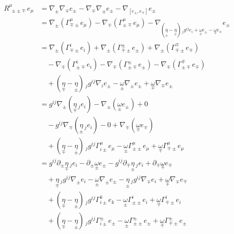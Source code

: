 \documentclass[a4paper,11pt]{article}
\numberwithin{equation}{section}
\theoremstyle{definition}
\begin{document}
\begin{align*}
    R^\mu_{\;\pm\pm\mp} e_\mu &= \nabla_\pm\nabla_\mp e_\pm-\nabla_\mp\nabla_\pm e_\pm-\nabla_{[e_\pm,e_\mp]}e_\pm\\
    &=\nabla_\pm \left(\Gamma_{\mp\pm}^\mu e_\mu \right) - \nabla_\mp \left(\Gamma_{\pm\mp}^\mu e_\mu \right)  - \nabla_{(\underset{\pm}{\eta}-\underset{\mp}{\eta})\,_jg^{ij} e_i+ \underset{\pm}{\omega} e_\pm - \underset{\mp}{\omega} e_\mp}e_\pm\\
    &=\nabla_\pm \left(\Gamma_{\mp\pm}^i e_i \right)
    + \nabla_\pm \left(\Gamma_{\mp\pm}^\pm e_\pm \right)
    + \nabla_\pm \left(\Gamma_{\mp\pm}^\mp e_\mp \right)\\
    &\quad - \nabla_\mp \left(\Gamma_{\pm\mp}^i e_i \right)
    - \nabla_\mp \left(\Gamma_{\pm\mp}^\pm e_\pm \right)
    - \nabla_\mp \left(\Gamma_{\pm\mp}^\mp e_\mp \right)\\
    &\quad + (\underset{\mp}{\eta}-\underset{\pm}{\eta})\,_jg^{ij}\nabla_ie_\pm
    - \underset{\pm}{\omega} \nabla_\pm e_\pm
    + \underset{\mp}{\omega} \nabla_\mp e_\pm\\
    &=g^{ij}\nabla_\pm (\underset{\mp}{\eta}\,_j e_i )
    - \nabla_\pm (\underset{\pm}{\omega} e_\pm ) + 0\\
    &\quad - g^{ij} \nabla_\mp (\underset{\pm}{\eta}\,_j e_i) - 0
    + \nabla_\mp (\underset{\mp}{\omega} e_\mp )\\
    &\quad + (\underset{\mp}{\eta}-\underset{\pm}{\eta})\,_jg^{ij}\Gamma_{i\pm}^\mu e_\mu
    - \underset{\pm}{\omega} \Gamma_{\pm\pm}^\mu e_\mu
    + \underset{\mp}{\omega} \Gamma_{\mp\pm}^\mu e_\mu\\
    &=g^{ij}\partial_\pm \underset{\mp}{\eta}\,_j e_i
    - \partial_\pm \underset{\pm}{\omega} e_\pm  - g^{ij} \partial_\mp \underset{\pm}{\eta}\,_j e_i
    + \partial_\mp \underset{\mp}{\omega} e_\mp \\
    &\quad + \underset{\mp}{\eta}\,_jg^{ij}\nabla_\pm e_i
    - \underset{\pm}{\omega} \nabla_\pm e_\pm - \underset{\pm}{\eta}\,_jg^{ij} \nabla_\mp e_i
    + \underset{\mp}{\omega} \nabla_\mp e_\mp\\
    &\quad + (\underset{\mp}{\eta}-\underset{\pm}{\eta})\,_jg^{ij}\Gamma_{i\pm}^k e_k
    - \underset{\pm}{\omega} \Gamma_{\pm\pm}^i e_i
    + \underset{\mp}{\omega} \Gamma_{\mp\pm}^i e_i\\
    &\quad + (\underset{\mp}{\eta}-\underset{\pm}{\eta})\,_jg^{ij}\Gamma_{i\pm}^\pm e_\pm
    - \underset{\pm}{\omega} \Gamma_{\pm\pm}^\pm e_\pm
    + \underset{\mp}{\omega} \Gamma_{\mp\pm}^\pm e_\pm\\

\end{align*}
\end{document}
